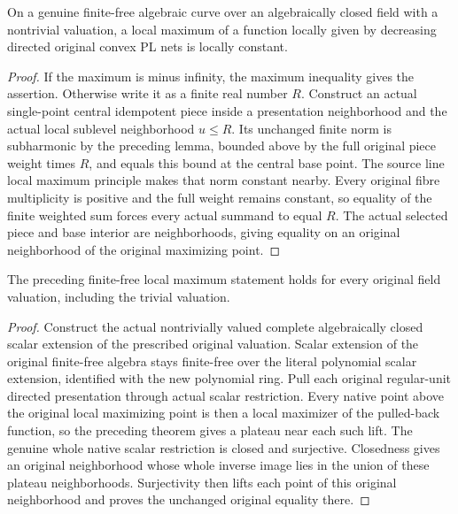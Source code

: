 \begin{theorem}
\label{thm:fc-directed-pl-curve-local-maximum}
\leanok
{}
On a genuine finite-free algebraic curve over an algebraically closed field
with a nontrivial valuation, a local maximum of a function locally given by
decreasing directed original convex PL nets is locally constant.
\end{theorem}
\begin{proof}
If the maximum is minus infinity, the maximum inequality gives the assertion.
Otherwise write it as a finite real number $R$. Construct an actual single-point
central idempotent piece inside a presentation neighborhood and the actual
local sublevel neighborhood $u\le R$. Its unchanged finite norm is subharmonic
by the preceding lemma, bounded above by the full original piece weight times
$R$, and equals this bound at the central base point. The source line local
maximum principle makes that norm constant nearby. Every original fibre
multiplicity is positive and the full weight remains constant, so equality
of the finite weighted sum forces every actual summand to equal $R$. The
actual selected piece and base interior are neighborhoods, giving equality
on an original neighborhood of the original maximizing point.
\end{proof}

\begin{lemma}
\label{lem:fc-directed-pl-all-valuations-local-maximum}
\leanok
{}
The preceding finite-free local maximum statement holds for every original
field valuation, including the trivial valuation.
\end{lemma}
\begin{proof}
Construct the actual nontrivially valued complete algebraically closed scalar
extension of the prescribed original valuation. Scalar extension of the
original finite-free algebra stays finite-free over the literal polynomial
scalar extension, identified with the new polynomial ring. Pull each original
regular-unit directed presentation through actual scalar restriction. Every
native point above the original local maximizing point is then a local
maximizer of the pulled-back function, so the preceding theorem gives a
plateau near each such lift. The genuine whole native scalar restriction is
closed and surjective. Closedness gives an original neighborhood whose whole
inverse image lies in the union of these plateau neighborhoods. Surjectivity
then lifts each point of this original neighborhood and proves the unchanged
original equality there.
\end{proof}

